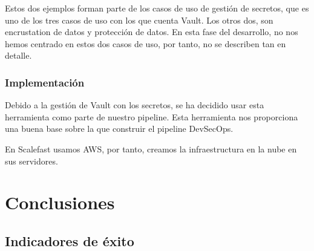 \documentclass[12pt]{report} %
\begin{document}
Estos dos ejemplos forman parte de los casos de uso de gestión de secretos, que
es uno de los tres casos de uso con los que cuenta Vault.
Los otros dos, son encrustation de datos y protección de datos.
En esta fase del desarrollo, no nos hemos centrado en estos dos casos de uso,
por tanto, no se describen tan en detalle.

\subsection{Implementación}

Debido a la gestión de Vault con los secretos, se ha decidido usar esta
herramienta como parte de nuestro \gls{pipeline}.
Esta herramienta nos proporciona una buena base sobre la que construir el
\gls{pipeline} \gls{DevSecOps}.

En Scalefast usamos \gls{AWS}, por tanto, creamos la infraestructura en la nube
en sus servidores.




\chapter{Conclusiones}

\section{Indicadores de éxito}

\clearpage

\printglossary[type=\acronymtype]

\printglossary




\end{document}
